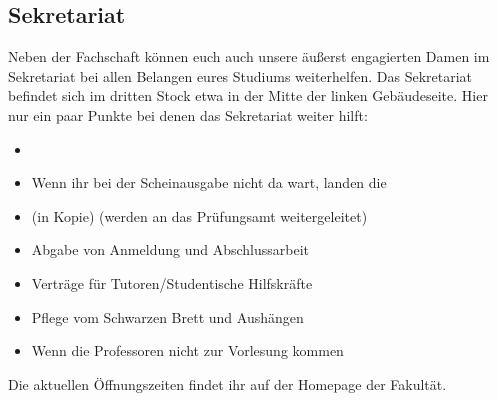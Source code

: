 \subsection{Sekretariat}
Neben der Fachschaft können euch auch unsere äußerst engagierten 
Damen im Sekretariat bei allen Belangen eures Studiums weiterhelfen. 
Das Sekretariat befindet sich im dritten Stock etwa in der Mitte der 
linken Gebäudeseite. 
Hier nur ein paar Punkte bei denen das Sekretariat weiter hilft:
\begin{itemize}
\item {} 
\item Wenn ihr bei der Scheinausgabe nicht da wart, landen die 	
\item {} (in Kopie) (werden an das Prüfungsamt weitergeleitet) 
\item Abgabe von Anmeldung und Abschlussarbeit 
\item Verträge für Tutoren/Studentische Hilfskräfte 
\item Pflege vom Schwarzen Brett und Aushängen 
\item Wenn die Professoren nicht zur Vorlesung kommen
\end{itemize}
Die aktuellen Öffnungszeiten findet ihr auf der Homepage der Fakultät. 